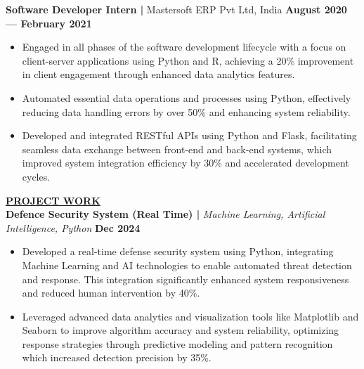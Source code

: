 \documentclass{article}
\begin{document}
\vspace{1mm} 

\noindent \textbf{Software Developer Intern | } Mastersoft ERP Pvt Ltd, India \hfill \textbf{August 2020 — February 2021}
\begin{itemize}[noitemsep,nolistsep,leftmargin=*]
\item {\small Engaged in all phases of the software development lifecycle with a focus on client-server applications using Python and R, achieving a 20\% improvement in client engagement through enhanced data analytics features.}
\item {\small Automated essential data operations and processes using Python, effectively reducing data handling errors by over 50\% and enhancing system reliability.}
\item {\small Developed and integrated RESTful APIs using Python and Flask, facilitating seamless data exchange between front-end and back-end systems, which improved system integration efficiency by 30\% and accelerated development cycles.}
\end{itemize}

\vspace{2mm} 

%
%
\noindent \textbf{\underline{PROJECT WORK}} \\
\noindent \textbf{Defence Security System (Real Time) | } \textit{Machine Learning, Artificial Intelligence, Python} \hfill \textbf{Dec 2024}
\begin{itemize}[noitemsep,nolistsep,leftmargin=*]
\item {\small Developed a real-time defense security system using Python, integrating Machine Learning and AI technologies to enable automated threat detection and response. This integration significantly enhanced system responsiveness and reduced human intervention by 40\%.}
\item {\small Leveraged advanced data analytics and visualization tools like Matplotlib and Seaborn to improve algorithm accuracy and system reliability, optimizing response strategies through predictive modeling and pattern recognition which increased detection precision by 35\%.}
\end{itemize}
\end{document}
